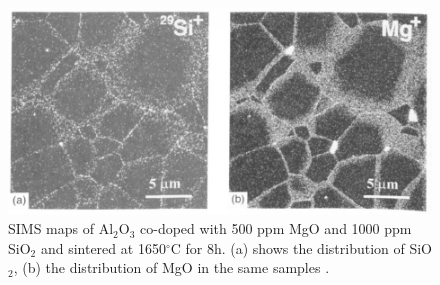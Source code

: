 \newpage
\begin{figure}[H]
	\centering
	\includegraphics{Chapter-1/Figures/Figure3.png}
	\caption{SIMS maps of Al$_{2}$O$_{3}$ co-doped with 500 ppm MgO and 1000 ppm SiO$_{2}$ and sintered at 1650$^{\circ}$C for 8h. (a) shows the distribution of SiO$_{2}$, (b) the distribution of MgO in the same samples \cite{Gavrilov1999}.}
	\label{Ch1-figure:Figure3}
\end{figure}
